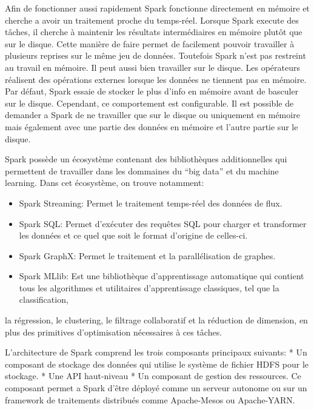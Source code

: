 \documentclass[a4paper,10pt,openany,oneside]{sphinxmanual}
\begin{document}
Afin de fonctionner aussi rapidement Spark fonctionne directement en mémoire et cherche a avoir un traitement proche du temps-réel. Lorsque Spark execute des tâches,
il cherche à maintenir les résultats intermédiaires en mémoire plutôt que sur le disque. Cette manière de faire permet de facilement pouvoir travailler à plusieurs
reprises sur le même jeu de données. Toutefois Spark n'est pas restreint au travail en mémoire. Il peut aussi bien travailler sur le disque. Les opérateurs réalisent
des opérations externes lorsque les données ne tiennent pas en mémoire. Par défaut, Spark essaie de stocker le plus d'info en mémoire avant de basculer sur le disque.
Cependant, ce comportement est configurable. Il est possible de demander a Spark de ne travailler que sur le disque ou uniquement en mémoire mais également avec une
partie des données en mémoire et l'autre partie sur le disque.

Spark possède un écosystème contenant des bibliothèques additionnelles qui permettent de travailler dans les dommaines du ``big data'' et du machine learning.
Dans cet écosystème, on trouve notamment:
\begin{itemize}
\item {} 
Spark Streaming: Permet le traitement temps-réel des données de flux.

\item {} 
Spark SQL: Permet d'exécuter des requêtes SQL pour charger et transformer les données et ce quel que soit le format d'origine de celles-ci.

\item {} 
Spark GraphX: Permet le traitement et la parallélisation de graphes.

\item {} 
Spark MLlib: Est une bibliothèque d'apprentissage automatique qui contient tous les algorithmes et utilitaires d'apprentissage classiques, tel que la classification,

\end{itemize}

la régression, le clustering, le filtrage collaboratif et la réduction de dimension, en plus des primitives d'optimisation nécessaires à ces tâches.

L'architecture de Spark comprend les trois composants principaux suivants:
* Un composant de stockage des données qui utilise le système de fichier HDFS pour le stockage.
* Une API haut-niveau
* Un composant de gestion des ressources. Ce composant permet a Spark d'être déployé comme un serveur autonome ou sur un framework de traitements distribués comme Apache-Mesos
ou Apache-YARN.
\end{document}
